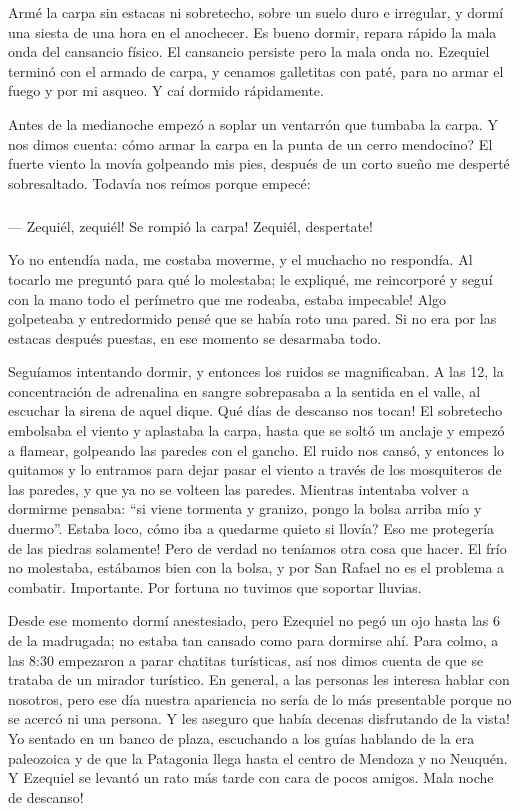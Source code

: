 Arm\'e la carpa sin estacas ni sobretecho, sobre un suelo duro e irregular, y
dorm\'i una siesta de una hora en el anochecer. Es bueno dormir, repara r\'apido
la mala onda del cansancio f\'isico. El cansancio persiste pero la mala onda no.
Ezequiel termin\'o con el armado de carpa, y cenamos galletitas con pat\'e, para
no armar el fuego y por mi asqueo. Y ca\'i dormido r\'apidamente.

Antes de la medianoche empez\'o a soplar un ventarr\'on que tumbaba la carpa. Y
nos dimos cuenta: \textquestiondown c\'omo armar la carpa en la punta de un
cerro mendocino? El fuerte viento la mov\'ia golpeando mis pies, despu\'es de un
corto sue\~no me despert\'e sobresaltado. Todav\'ia nos re\'imos porque
empec\'e:

\subparagraph{}\label{ssub:tormenta}
--- \textexclamdown Zequi\'el, zequi\'el! \textexclamdown Se rompi\'o la carpa!
  Zequi\'el, \textexclamdown despertate!\\
\hangindent=1.6cm

Yo no entend\'ia nada, me costaba moverme, y el muchacho no respond\'ia. Al
tocarlo me pregunt\'o para qu\'e lo molestaba; le expliqu\'e, me reincorpor\'e y
segu\'i con la mano todo el per\'imetro que me rodeaba, \textexclamdown estaba
impecable! Algo golpeteaba y entredormido pens\'e que se hab\'ia roto una pared.
Si no era por las estacas despu\'es puestas, en ese momento se desarmaba todo.

Segu\'iamos intentando dormir, y entonces los ruidos se magnificaban. A las 12,
la concentraci\'on de adrenalina en sangre sobrepasaba a la sentida en el valle,
al escuchar la sirena de aquel dique. \textexclamdown Qu\'e d\'ias de descanso
nos tocan! El sobretecho embolsaba el viento y aplastaba la carpa, hasta que se
solt\'o un anclaje y empez\'o a flamear, golpeando las paredes con el gancho. El
ruido nos cans\'o, y entonces lo quitamos y lo entramos para dejar pasar el
viento a trav\'es de los mosquiteros de las paredes, y que ya no se volteen las
paredes. Mientras intentaba volver a dormirme pensaba: ``si viene tormenta y
granizo, pongo la bolsa arriba m\'io y duermo''. Estaba loco, \textquestiondown
c\'omo iba a quedarme quieto si llov\'ia? \textexclamdown Eso me proteger\'ia de
las piedras solamente! Pero de verdad no ten\'iamos otra cosa que hacer. El
fr\'io no molestaba, est\'abamos bien con la bolsa, y por San Rafael no es el
problema a combatir. Importante. Por fortuna no tuvimos que soportar lluvias.

Desde ese momento dorm\'i anestesiado, pero Ezequiel no peg\'o un ojo hasta las
6 de la madrugada; no estaba tan cansado como para dormirse ah\'i. Para colmo, a
las 8:30 empezaron a parar chatitas tur\'isticas, as\'i nos dimos cuenta de que
se trataba de un mirador tur\'istico. En general, a las personas les interesa
hablar con nosotros, pero ese d\'ia nuestra apariencia no ser\'ia de lo m\'as
presentable porque no se acerc\'o ni una persona. \textexclamdown Y les aseguro
que hab\'ia decenas disfrutando de la vista! Yo sentado en un banco de plaza,
escuchando a los gu\'ias hablando de la era paleozoica y de que la Patagonia
llega hasta el centro de Mendoza y no Neuqu\'en. Y Ezequiel se levant\'o un rato
m\'as tarde con cara de pocos amigos. \textexclamdown Mala noche de descanso!

